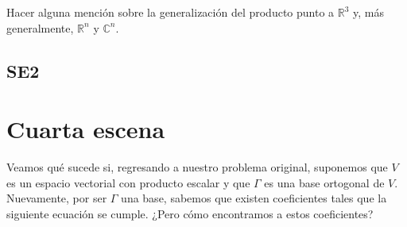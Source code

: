 \documentclass[12pt,dvipsnames]{article}
\numberwithin{equation}{section}
\begin{document}


Hacer alguna mención sobre la generalización del producto punto a $\mathbb{R}^3$ y, más generalmente, $\mathbb{R}^n$ y $\mathbb{C}^n$.

\subsection*{SE2}


\newpage
\section{Cuarta escena}

Veamos qué sucede si, regresando a nuestro problema original, suponemos que $V$ es un espacio vectorial con producto escalar y que $\Gamma$ es una base ortogonal de $V$. Nuevamente, por ser $\Gamma$ una base, sabemos que existen coeficientes tales que la siguiente ecuación se cumple. ¿Pero cómo encontramos a estos coeficientes?
\end{document}
